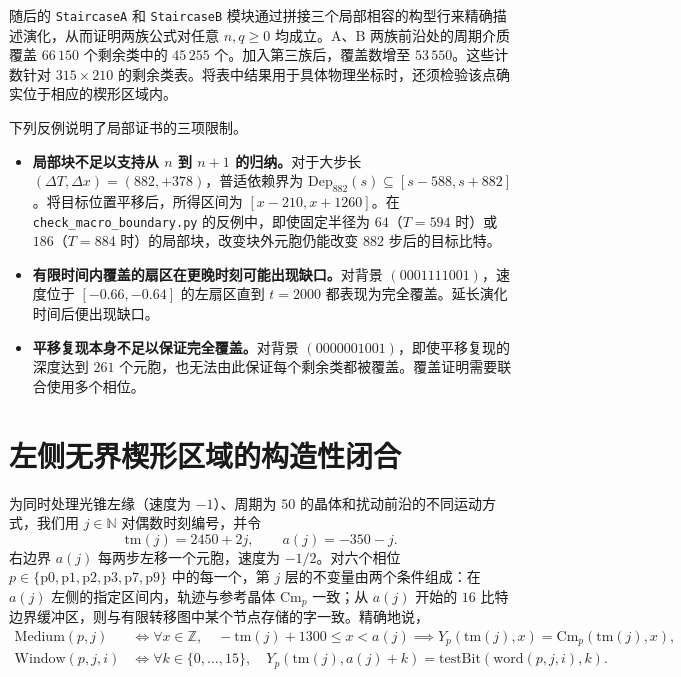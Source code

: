 \documentclass[11pt, a4paper]{article}
\begin{document}
随后的 \texttt{StaircaseA} 和 \texttt{StaircaseB} 模块通过拼接三个局部相容的构型行来精确描述演化，从而证明两族公式对任意 $n,q\ge0$ 均成立。A、B 两族前沿处的周期介质覆盖 $66\,150$ 个剩余类中的 $45\,255$ 个。加入第三族后，覆盖数增至 $53\,550$。这些计数针对 $315\times210$ 的剩余类表。将表中结果用于具体物理坐标时，还须检验该点确实位于相应的楔形区域内。

下列反例说明了局部证书的三项限制。
\begin{itemize}
    \item \textbf{局部块不足以支持从 $n$ 到 $n+1$ 的归纳。}对于大步长 $(\Delta T, \Delta x) = (882, +378)$，普适依赖界为 $\mathrm{Dep}_{882}(s) \subseteq [s - 588, s + 882]$。将目标位置平移后，所得区间为 $[x - 210, x + 1260]$。在 \texttt{check\_macro\_boundary.py} 的反例中，即使固定半径为 $64$（$T=594$ 时）或 $186$（$T=884$ 时）的局部块，改变块外元胞仍能改变 $882$ 步后的目标比特。
    \item \textbf{有限时间内覆盖的扇区在更晚时刻可能出现缺口。}对背景 $(0001111001)$，速度位于 $[-0.66, -0.64]$ 的左扇区直到 $t = 2000$ 都表现为完全覆盖。延长演化时间后便出现缺口。
    \item \textbf{平移复现本身不足以保证完全覆盖。}对背景 $(0000001001)$，即使平移复现的深度达到 $261$ 个元胞，也无法由此保证每个剩余类都被覆盖。覆盖证明需要联合使用多个相位。
\end{itemize}

\section{左侧无界楔形区域的构造性闭合}

为同时处理光锥左缘（速度为 $-1$）、周期为 $50$ 的晶体和扰动前沿的不同运动方式，我们用 $j \in \mathbb{N}$ 对偶数时刻编号，并令
\begin{equation}
\mathrm{tm}(j) = 2450 + 2j, \qquad a(j) = -350 - j.
\end{equation}
右边界 $a(j)$ 每两步左移一个元胞，速度为 $-1/2$。对六个相位 $p \in \{\mathrm{p0}, \mathrm{p1}, \mathrm{p2}, \mathrm{p3}, \mathrm{p7}, \mathrm{p9}\}$ 中的每一个，第 $j$ 层的不变量由两个条件组成：在 $a(j)$ 左侧的指定区间内，轨迹与参考晶体 $\mathrm{Cm}_p$ 一致；从 $a(j)$ 开始的 $16$ 比特边界缓冲区，则与有限转移图中某个节点存储的字一致。精确地说，
\begin{align}
\mathrm{Medium}(p, j) &\iff \forall x \in \mathbb{Z},\quad -\mathrm{tm}(j) + 1300 \le x < a(j) \implies Y_p(\mathrm{tm}(j), x) = \mathrm{Cm}_p(\mathrm{tm}(j), x), \\
\mathrm{Window}(p, j, i) &\iff \forall k \in \{0, \dots, 15\},\quad Y_p(\mathrm{tm}(j), a(j) + k) = \mathrm{testBit}(\mathrm{word}(p, j, i), k).
\end{align}
\end{document}
